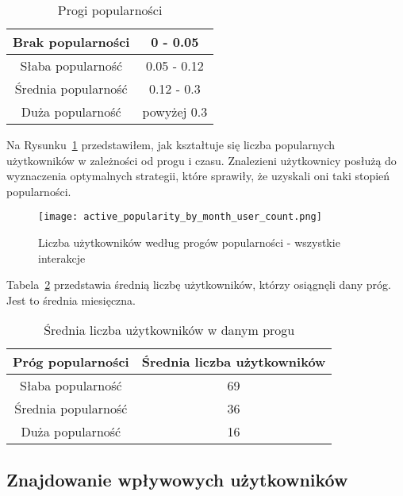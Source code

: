 \documentclass[polish,12pt]{aghthesis}
\begin{document}
\begin{table}[h]
\centering
\begin{tabular}{|c|c|}
\hline
Brak popularności & 0 - 0.05 \\
\hline
Słaba popularność & 0.05 - 0.12 \\
\hline
Średnia popularność & 0.12 - 0.3 \\
\hline
Duża popularność & powyżej 0.3 \\
\hline
\end{tabular}
\caption[Progi popularności]{Progi popularności}
\label{tab:progi_popul}
\end{table}

Na Rysunku~\ref{fig:active_popularity_count} przedstawiłem, jak kształtuje się liczba popularnych użytkowników w zależności od progu i czasu. Znalezieni użytkownicy posłużą do wyznaczenia optymalnych strategii, które sprawiły, że uzyskali oni taki stopień popularności.

\begin{figure}[!htbp]
    \centering
    \texttt{[image: active\_popularity\_by\_month\_user\_count.png]}
    \caption{Liczba użytkowników według progów popularności - wszystkie interakcje}
    \label{fig:active_popularity_count}
\end{figure}



\FloatBarrier

Tabela~\ref{tab:popul_count} przedstawia średnią liczbę użytkowników, którzy osiągnęli dany próg. Jest to średnia miesięczna.

\begin{table}[h]
\centering
\begin{tabular}{|c|c|}
\hline
\textbf{Próg popularności} & \textbf{Średnia liczba użytkowników} \\
\hline
Słaba popularność & 69 \\
\hline
Średnia popularność & 36 \\
\hline
Duża popularność & 16 \\
\hline
\end{tabular}
\caption{Średnia liczba użytkowników w danym progu}
\label{tab:popul_count}
\end{table}

\FloatBarrier



\subsection{Znajdowanie wpływowych użytkowników}
\end{document}
